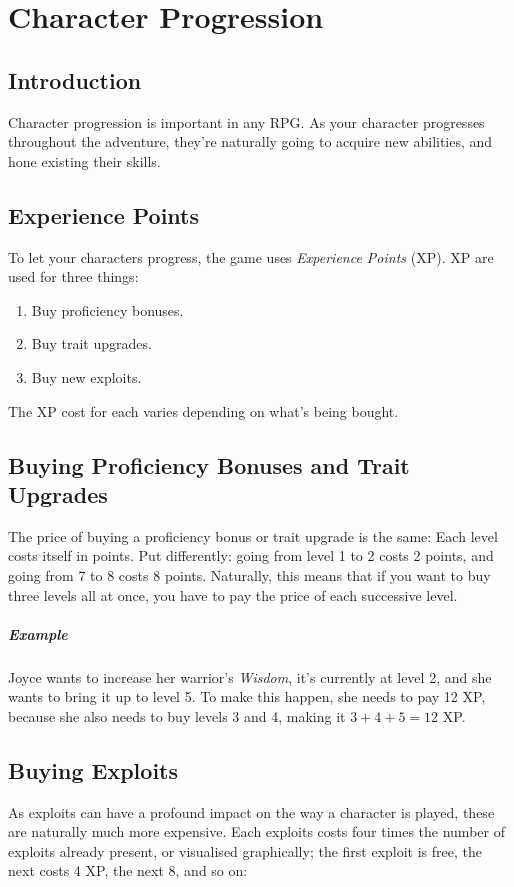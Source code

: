\chapter{Character Progression}\label{chap:char-prog}
\section{Introduction}
Character progression is important in any RPG.
As your character progresses throughout the adventure, they're naturally going to acquire new abilities, and hone existing their skills.

\section{Experience Points}
To let your characters progress, the game uses \textit{Experience Points} (XP).
XP are used for three things:
\begin{enumerate}
\item Buy proficiency bonuses.
\item Buy trait upgrades.
\item Buy new exploits.
\end{enumerate}
The XP cost for each varies depending on what's being bought.

\section{Buying Proficiency Bonuses and Trait Upgrades}
The price of buying a proficiency bonus or trait upgrade is the same:
Each level costs itself in points.
Put differently: going from level 1 to 2 costs 2 points, and going from 7 to 8 costs 8 points.
Naturally, this means that if you want to buy three levels all at once, you have to pay the price of each successive level.

\paragraph{Example} Joyce wants to increase her warrior's \textit{Wisdom}, it's currently at level 2, and she wants to bring it up to level 5.
To make this happen, she needs to pay 12 XP, because she also needs to buy levels 3 and 4, making it $3 + 4 + 5 = 12$ XP.

\section{Buying Exploits}
As exploits can have a profound impact on the way a character is played, these are naturally much more expensive.
Each exploits costs four times the number of exploits already present, or visualised graphically; the first exploit is free, the next costs 4 XP, the next 8, and so on:

